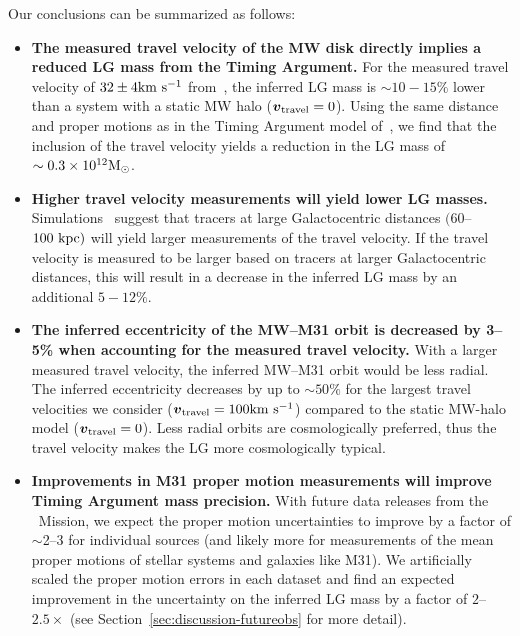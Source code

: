 \documentclass[twocolumn]{aastex631}
\newcommand{\bov}{\ensuremath{\boldsymbol{v}}}
\newcommand{\vtrav}{\ensuremath{\bov_{\rm travel}}}
\begin{document}
Our conclusions can be summarized as follows:
\begin{itemize}
  \item \textbf{The measured travel velocity of the MW disk directly implies
  a reduced LG mass from the Timing Argument.}
  For the measured travel velocity of $32\pm4 \mathrm{km}~\mathrm{s}^{-1}$ from~\cite{Petersen2021},
  the inferred LG mass is $\sim10-15\%$ lower than a system with a static MW
  halo ($\vtrav=0$).
  Using the same distance and proper motions as in the Timing Argument model
  of~\cite{vdm2012}, we find that the inclusion of the travel velocity yields
  a reduction in the LG mass of $\sim0.3\times 10^{12}\mathrm{M}_\odot$.
  \item \textbf{Higher travel velocity measurements will yield lower LG masses.}
  Simulations~\citep{Garavito-Camargo2021b} suggest that tracers at large
  Galactocentric distances $(60$--$100~\mathrm{kpc})$ will yield larger measurements of
  the travel velocity.
  If the travel velocity is measured to be larger based on tracers at larger
  Galactocentric distances, this will result in a decrease in the inferred LG
  mass by an additional $5-12\%$.
  \item \textbf{The inferred eccentricity of the MW--M31 orbit is decreased by
  3--5\% when accounting for the measured travel velocity.}
  With a larger measured travel velocity, the inferred MW--M31 orbit would be
  less radial.
  The inferred eccentricity decreases by up to $\sim50\%$ for the largest travel
  velocities we consider ($\vtrav=100\kms$) compared to the static MW-halo model
  ($\vtrav=0$).
  Less radial orbits are cosmologically preferred, thus the travel velocity
  makes the LG more cosmologically typical.
  \item \textbf{Improvements in M31 proper motion measurements will improve
  Timing Argument mass precision.}
  With future data releases from the \gaia\ Mission, we expect the proper motion
  uncertainties to improve by a factor of $\sim$2--3 for individual sources (and
  likely more for measurements of the mean proper motions of stellar systems
  and galaxies like M31).
  We artificially scaled the proper motion errors in each dataset and find an
  expected improvement in the uncertainty on the inferred LG mass by a factor of
  $2$--$2.5\times$ (see Section~\ref{sec:discussion-futureobs} for more detail).
\end{itemize}
\end{document}
